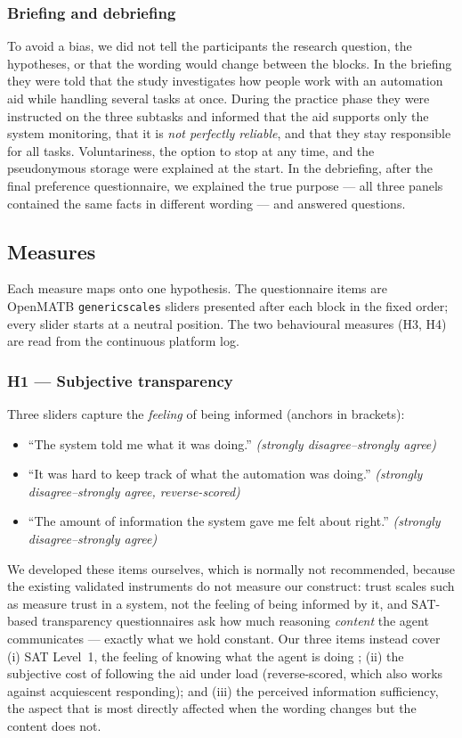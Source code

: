\documentclass[10pt,twocolumn]{article}
\begin{document}
\subsubsection{Briefing and debriefing}
To avoid a bias, we did not tell the participants the research question, the hypotheses, or that the wording would change between the blocks. In the briefing they were told that the study investigates how people work with an automation aid while handling several tasks at once. During the practice phase they were instructed on the three subtasks and informed that the aid supports only the system monitoring, that it is \textit{not perfectly reliable}, and that they stay responsible for all tasks. Voluntariness, the option to stop at any time, and the pseudonymous storage were explained at the start. In the debriefing, after the final preference questionnaire, we explained the true purpose --- all three panels contained the same facts in different wording --- and answered questions.

\subsection{Measures}
Each measure maps onto one hypothesis. The questionnaire items are OpenMATB \texttt{genericscales} sliders presented after each block in the fixed order; every slider starts at a neutral position. The two behavioural measures (H3, H4) are read from the continuous platform log.

\subsubsection{H1 --- Subjective transparency}
Three sliders capture the \textit{feeling} of being informed (anchors in brackets):
\begin{itemize}
  \item ``The system told me what it was doing.'' \textit{(strongly disagree--strongly agree)}
  \item ``It was hard to keep track of what the automation was doing.'' \textit{(strongly disagree--strongly agree, reverse-scored)}
  \item ``The amount of information the system gave me felt about right.'' \textit{(strongly disagree--strongly agree)}
\end{itemize}
We developed these items ourselves, which is normally not recommended, because the existing validated instruments do not measure our construct: trust scales such as \textcite{Jian2000} measure trust in a system, not the feeling of being informed by it, and SAT-based transparency questionnaires \parencite{Chen2014,Mercado2016} ask how much reasoning \textit{content} the agent communicates --- exactly what we hold constant. Our three items instead cover (i) SAT Level~1, the feeling of knowing what the agent is doing \parencite{Chen2014}; (ii) the subjective cost of following the aid under load (reverse-scored, which also works against acquiescent responding); and (iii) the perceived information sufficiency, the aspect that is most directly affected when the wording changes but the content does not.
\end{document}
